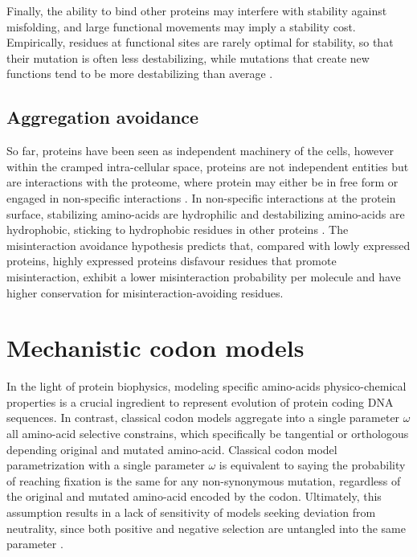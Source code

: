 Finally, the ability to bind other proteins may interfere with stability against misfolding, and large functional movements may imply a stability cost.
Empirically, residues at functional sites are rarely optimal for stability, so that their mutation is often less destabilizing, while mutations that create new functions tend to be more destabilizing than average \citep{Chi2016}.

\subsection{Aggregation avoidance}

So far, proteins have been seen as independent machinery of the cells, however within the cramped intra-cellular space, proteins are not independent entities but are interactions with the proteome, where protein may either be in free form or engaged in non-specific interactions \citep{Yang2012, Zhang2013}.
In non-specific interactions at the protein surface, stabilizing amino-acids are hydrophilic and destabilizing amino-acids are hydrophobic, sticking to hydrophobic residues in other proteins \citep{Dixit2013,Manhart2015}.
The misinteraction avoidance hypothesis predicts that, compared with lowly expressed proteins, highly expressed proteins disfavour residues that promote misinteraction, exhibit a lower misinteraction probability per molecule and have higher conservation for misinteraction-avoiding residues.


\section{Mechanistic {codon} models}
In the light of protein biophysics, modeling specific amino-acids physico-chemical properties is a crucial ingredient to represent evolution of protein coding \acrshort{DNA} sequences.
In contrast, classical \gls{codon} models aggregate into a single parameter $\omega$ all amino-acid selective constrains, which specifically be tangential or orthologous depending original and mutated amino-acid.
Classical \gls{codon} model parametrization with a single parameter $\omega$ is equivalent to saying the probability of reaching fixation is the same for any non-synonymous mutation, regardless of the original and mutated amino-acid encoded by the \gls{codon}.
Ultimately, this assumption results in a lack of sensitivity of models seeking deviation from neutrality, since both positive and negative selection are untangled into the same parameter \citep{Rodrigue2008a}.

